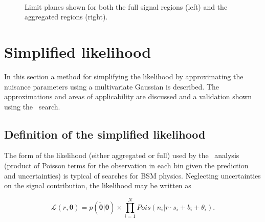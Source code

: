 \begin{figure}[!tbhp]
\begin{center}
     \\
  \end{center}
    \caption{Limit planes shown for both the full signal regions
    (left) and the aggregated regions (right).\label{fig:limit-planes-agg}}
\end{figure}

\section{Simplified likelihood}

In this section a method for simplifying the likelihood by approximating the nuisance parameters
using a multivariate Gaussian is described. The approximations and areas of applicability 
are discussed and a validation shown using the \alphat~search.

\subsection{Definition of the simplified likelihood}

The form of the likelihood (either aggregated or full) used by the \alphat~analysis (product of Poisson terms 
for the observation in each bin given the prediction and uncertainties)
is typical of searches for BSM physics. Neglecting uncertainties on the signal contribution,
the likelihood may be written as 

\begin{equation}
\mathcal{L}(r,\boldsymbol{\theta}) = p(\tilde{\boldsymbol{\theta}}|\boldsymbol{\theta}) \times \prod_{i=1}^{N} Pois(n_{i}|r \cdot s_{i}+b_{i}+\theta_{i}).
\label{eq:poisson-prob}
\end{equation}

